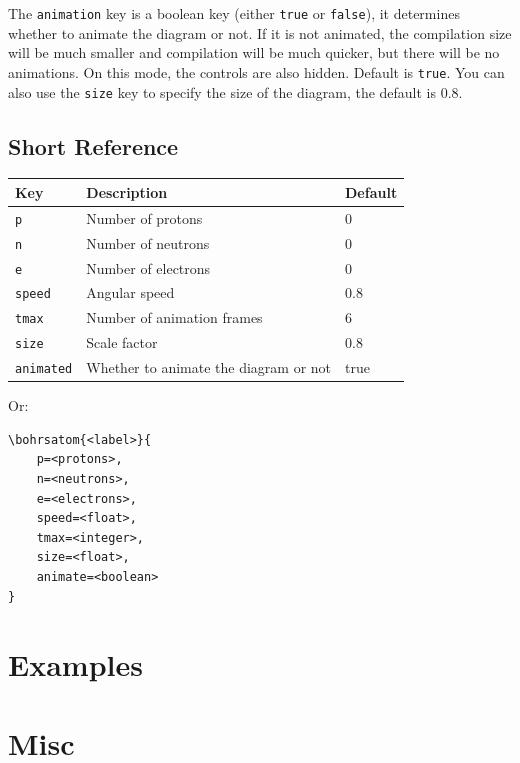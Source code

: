 \documentclass[
	a4paper,
	10pt,
]{article}
\begin{document}
The \texttt{animation} key is a boolean key (either \texttt{true} or \texttt{false}), it determines whether to animate the diagram or not. If it is not animated, the compilation size will be much smaller and compilation will be much quicker, but there will be no animations. On this mode, the controls are also hidden. Default is \texttt{true}. You can also use the \texttt{size} key to specify the size of the diagram, the default is $0.8$.

\subsection{Short Reference}

\begin{center}
\begin{tabular}{l l l}
\textbf{Key} & \textbf{Description} & \textbf{Default} \\
\hline
\texttt{p} & Number of protons & 0 \\
\texttt{n} & Number of neutrons & 0 \\
\texttt{e} & Number of electrons & 0 \\
\texttt{speed} & Angular speed & 0.8 \\
\texttt{tmax} & Number of animation frames & 6 \\
\texttt{size} & Scale factor & 0.8 \\
\texttt{animated} & Whether to animate the diagram or not & true \\
\end{tabular}
\end{center}

Or:

\begin{verbatim}
\bohrsatom{<label>}{
	p=<protons>,
	n=<neutrons>,
	e=<electrons>,
	speed=<float>,
	tmax=<integer>,
	size=<float>,
	animate=<boolean>
}
\end{verbatim}

\section{Examples}


\section{Misc}
\end{document}
